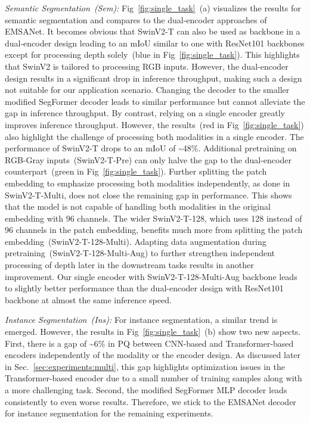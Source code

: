 \documentclass[conference]{IEEEtran}
\begin{document}
\setcounter{table}{0}

\textit{Semantic Segmentation~(Sem):} \enspace Fig~\ref{fig:single_task}~(a) visualizes the results for semantic segmentation and compares to the dual-encoder approaches of EMSANet.
It becomes obvious that SwinV2-T can also be used as backbone in a dual-encoder design leading to an mIoU similar to one with ResNet101 backbones except for processing depth solely~(blue in Fig~\ref{fig:single_task}).
This highlights that SwinV2 is tailored to processing RGB inputs.
However, the dual-encoder design results in a significant drop in inference throughput, making such a design not suitable for our application scenario.
Changing the decoder to the smaller modified SegFormer decoder leads to similar performance but cannot alleviate the gap in inference throughput.
By contrast, relying on a single encoder greatly improves inference throughput.
However, the results~(red in Fig~\ref{fig:single_task}) also highlight the challenge of processing both modalities in a single encoder.
The performance of SwinV2-T drops to an mIoU of \textasciitilde48\%. 
Additional pretraining on RGB-Gray inputs~(SwinV2-T-Pre) can only halve the gap to the dual-encoder counterpart~(green in Fig~\ref{fig:single_task}).
Further splitting the patch embedding to emphasize processing both modalities independently, as done in SwinV2-T-Multi, does not close the remaining gap in performance.
This shows that the model is not capable of handling both modalities in the original embedding with 96 channels.
The wider SwinV2-T-128, which uses 128 instead of 96 channels in the patch embedding, benefits much more from splitting the patch embedding~(SwinV2-T-128-Multi).
Adapting data augmentation during pretraining~(SwinV2-T-128-Multi-Aug) to further strengthen independent processing of depth later in the downstream tasks results in another improvement.
Our single encoder with SwinV2-T-128-Multi-Aug backbone leads to slightly better performance than the dual-encoder design with ResNet101 backbone at almost the same inference speed.

\textit{Instance Segmentation~(Ins):} \enspace For instance segmentation, a similar trend is emerged. 
However, the results in Fig~\ref{fig:single_task}~(b) show two new aspects.
First, there is a gap of \textasciitilde6\% in PQ between CNN-based and Transformer-based encoders independently of the modality or the encoder design.
As discussed later in Sec.~\ref{sec:experiments:multi}, this gap highlights optimization issues in the Transformer-based encoder due to a small number of training samples along with a more challenging task.
Second, the modified SegFormer MLP decoder leads consistently to even worse results.
Therefore, we stick to the EMSANet decoder for instance segmentation for the remaining experiments.
\end{document}
